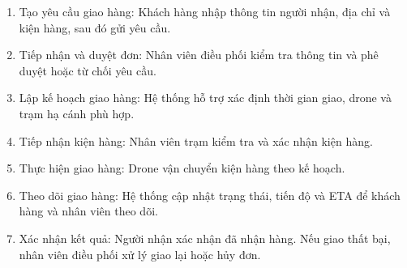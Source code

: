\begin{enumerate}
\def\labelenumi{\arabic{enumi}.}
\item
  Tạo yêu cầu giao hàng: Khách hàng nhập thông tin người nhận, địa chỉ và kiện hàng, sau đó gửi yêu cầu.
\item
  Tiếp nhận và duyệt đơn: Nhân viên điều phối kiểm tra thông tin và phê duyệt hoặc từ chối yêu cầu.
\item
  Lập kế hoạch giao hàng: Hệ thống hỗ trợ xác định thời gian giao, drone và trạm hạ cánh phù hợp.
\item
  Tiếp nhận kiện hàng: Nhân viên trạm kiểm tra và xác nhận kiện hàng.
\item
  Thực hiện giao hàng: Drone vận chuyển kiện hàng theo kế hoạch.
\item
  Theo dõi giao hàng: Hệ thống cập nhật trạng thái, tiến độ và ETA để khách hàng và nhân viên theo dõi.
\item
  Xác nhận kết quả: Người nhận xác nhận đã nhận hàng. Nếu giao thất bại, nhân viên điều phối xử lý giao lại hoặc hủy đơn.
\end{enumerate}

